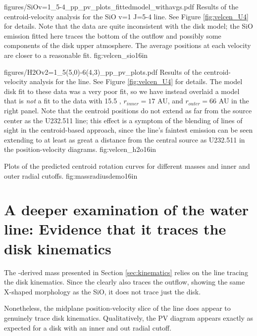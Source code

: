 \documentclass[twocolumn]{aastex61}
\begin{document}
\Figure
{figures/SiOv=1_5-4_pp_pv_plots_fittedmodel_withavgs.pdf}
{Results of the centroid-velocity analysis for the SiO v=1 J=5-4 line.
See Figure \ref{fig:velcen_U4} for details.
Note that the data are quite inconsistent with the disk model;
the SiO emission fitted here traces the bottom of the outflow
and possibly some components of the disk upper atmosphere.
The average positions at each velocity are closer to a reasonable fit.
}
{fig:velcen_sio}{1}{6in}

\Figure
{figures/H2Ov2=1_5(5,0)-6(4,3)_pp_pv_plots.pdf}
{Results of the centroid-velocity analysis for the \water line.
See Figure \ref{fig:velcen_U4} for details.
The model disk fit to these data was a very poor fit, so we
have instead overlaid a model that is \emph{not} a fit to the data
with 15.5 \msun, $r_{inner}=17$ AU, and $r_{outer}=66$ AU in the
right panel.
Note that the centroid positions do not extend as far from
the source center as the U232.511 line; this effect is 
a symptom of the blending of lines of sight in the centroid-based approach,
since the \water line's faintest emission can be seen extending to at least as
great a distance from the central source as U232.511 in the position-velocity
diagrams.
}
{fig:velcen_h2o}{1}{6in}

{Plots of the predicted centroid rotation curves for different masses
and inner and outer radial cutoffs.}
{fig:massradiusdemo}{1}{6in}


\section{A deeper examination of the water line: Evidence that it traces the disk kinematics}
\label{sec:waterlinerevisited}
The \water-derived mass presented in Section \ref{sec:kinematics} relies on the
\water line tracing the disk kinematics.  Since the \water clearly also
traces the outflow, showing the same X-shaped morphology as the SiO, it does
not  trace just the disk.

Nonetheless, the midplane position-velocity slice of the \water line does
appear to genuinely trace disk kinematics.  Qualitatively, the PV diagram
appears exactly as expected for a disk with an inner and out radial cutoff.
\end{document}
